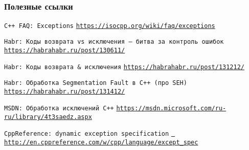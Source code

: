 \documentclass[10pt]{beamer}
\begin{document}
\begin{frame}[allowframebreaks]
  \frametitle<presentation>{Полезные ссылки}
    
  \begin{thebibliography}{10}
{
  \beamertemplatebookbibitems

  \texttt{C++ FAQ: Exceptions}
  \newblock \href{https://isocpp.org/wiki/faq/exceptions}{\texttt{https://isocpp.org/wiki/faq/exceptions}}
  
  \texttt{Habr: Коды возврата vs исключения — битва за контроль ошибок}
  \newblock \href{https://habrahabr.ru/post/130611/}{\texttt{https://habrahabr.ru/post/130611/}}
  
  \texttt{Habr: Коды возврата & исключения}
  \newblock \href{https://habrahabr.ru/post/131212/}{\texttt{https://habrahabr.ru/post/131212/}}
  
  \texttt{Habr: Обработка Segmentation Fault в C++ (про SEH)}
  \newblock \href{https://habrahabr.ru/post/131412/}{\texttt{https://habrahabr.ru/post/131412/}}
  
  \texttt{MSDN: Обработка исключений С++}
  \newblock \href{https://msdn.microsoft.com/ru-ru/library/4t3saedz.aspx}{\texttt{https://msdn.microsoft.com/ru-ru/library/4t3saedz.aspx}}
  
  \texttt{CppReference: dynamic exception specification}
  \newblock \href{http://en.cppreference.com/w/cpp/language/except_spec}{\texttt{ http://en.cppreference.com/w/cpp/language/except_spec}}
}
    
  \end{thebibliography}
\end{frame}
\end{document}
